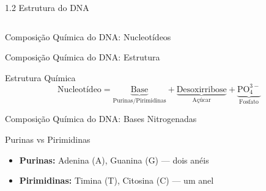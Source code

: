 \begin{frame}[allowframebreaks]{1.2 Estrutura do DNA}
\begin{columns}
\begin{center}
\end{center}
\end{columns}
\end{frame}



\begin{frame}{Composição Química do DNA: Nucleotídeos}
\end{frame}

\begin{frame}{Composição Química do DNA: Estrutura}
\begin{block}{Estrutura Química}
\begin{equation*}
\text{Nucleotídeo} = \underbrace{\text{Base}}_{\text{Purinas/Pirimidinas}} + \underbrace{\text{Desoxirribose}}_{\text{Açúcar}} + \underbrace{\text{PO}_4^{3-}}_{\text{Fosfato}}
\end{equation*}
\end{block}
\end{frame}

\begin{frame}{Composição Química do DNA: Bases Nitrogenadas}
\begin{exampleblock}{Purinas vs Pirimidinas}
\begin{itemize}
    \item \textbf{Purinas:} Adenina (A), Guanina (G) --- dois anéis
    \item \textbf{Pirimidinas:} Timina (T), Citosina (C) --- um anel
\end{itemize}
\end{exampleblock}
\end{frame}

